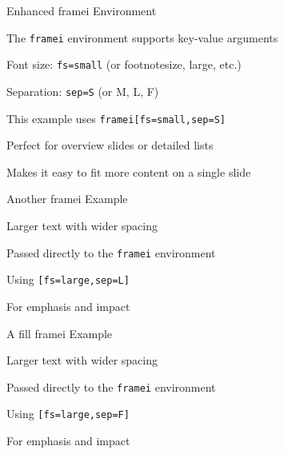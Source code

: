 \documentclass[11pt,compress,t,notes=noshow, xcolor=table]{beamer}
\begin{document}

\begin{framei}[fs=small,sep=S]{Enhanced framei Environment}
  \item The \texttt{framei} environment supports key-value arguments
  \item Font size: \texttt{fs=small} (or footnotesize, large, etc.)
  \item Separation: \texttt{sep=S} (or M, L, F)
  \item This example uses \texttt{framei[fs=small,sep=S]}
  \item Perfect for overview slides or detailed lists
  \item Makes it easy to fit more content on a single slide
\end{framei}


\begin{framei}[fs=large,sep=L]{Another framei Example}
  \item Larger text with wider spacing
  \item Passed directly to the \texttt{framei} environment
  \item Using \texttt{[fs=large,sep=L]}
  \item For emphasis and impact
\end{framei}


\begin{framei}[fs=normal,sep=F]{A fill framei Example}
  \item Larger text with wider spacing
  \item Passed directly to the \texttt{framei} environment
  \item Using \texttt{[fs=large,sep=F]}
  \item For emphasis and impact
\end{framei}

\end{document}
